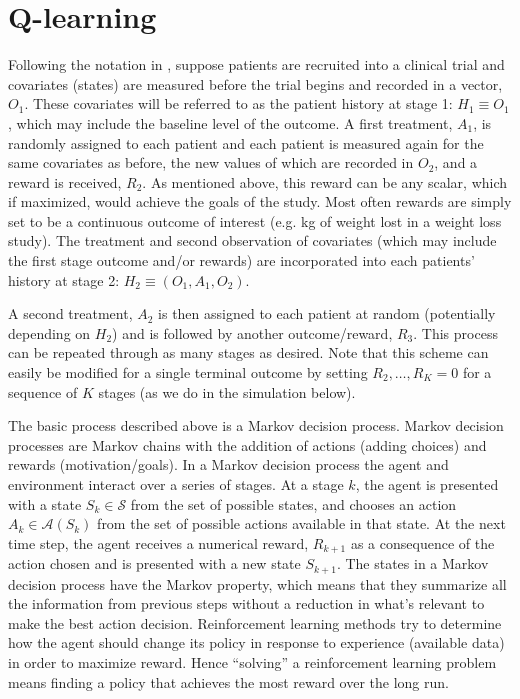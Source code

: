 \documentclass[12pt]{article}
\begin{document}


\section{Q-learning} %
\label{sec:q_learning}

Following the notation in \textcite{dtr-book}, suppose patients are recruited into a clinical trial and covariates (states) are measured before the trial begins and recorded in a vector, $O_{1}$. These covariates will be referred to as the patient history at stage 1: $H_{1} \equiv O_{1}$, which may include the baseline level of the outcome. A first treatment, $A_{1}$, is randomly assigned to each patient and each patient is measured again for the same covariates as before, the new values of which are recorded in $O_{2}$, and a reward is received, $R_{2}$. As mentioned above, this reward can be any scalar, which if maximized, would achieve the goals of the study. Most often rewards are simply set to be a continuous outcome of interest (e.g. kg of weight lost in a weight loss study). The treatment and second observation of covariates (which may include the first stage outcome and/or rewards) are incorporated into each patients' history at stage 2: $H_{2} \equiv (O_{1}, A_{1}, O_{2})$. 

A second treatment, $A_{2}$ is then assigned to each patient at random (potentially depending on $H_{2}$) and is followed by another outcome/reward, $R_{3}$. This process can be repeated through as many stages as desired. Note that this scheme can easily be modified for a single terminal outcome by setting $R_{2}, \ldots, R_{K} = 0$ for a sequence of $K$ stages (as we do in the simulation below).

The basic process described above is a Markov decision process. Markov decision processes are Markov chains with the addition of actions (adding choices) and rewards (motivation/goals). In a Markov decision process the agent and environment interact over a series of stages. At a stage $k$, the agent is presented with a state $S_k \in \mathcal{S}$ from the set of possible states, and chooses an action $A_{k} \in \mathcal{A}(S_{k})$ from the set of possible actions available in that state. At the next time step, the agent receives a numerical reward, $R_{k+1}$ as a consequence of the action chosen and is presented with a new state $S_{k+1}$. The states in a Markov decision process have the Markov property, which means that they summarize all the information from previous steps without a reduction in what's relevant to make the best action decision. Reinforcement learning methods try to determine how the agent should change its policy in response to experience (available data) in order to maximize reward. Hence ``solving'' a reinforcement learning problem means finding a policy that achieves the most reward over the long run.
\end{document}
